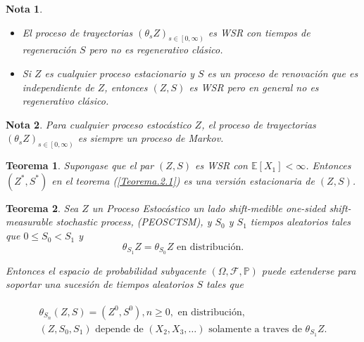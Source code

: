 \documentclass{article}
\newtheorem{Teo}{Teorema}%
\newtheorem{Note}{Nota}%
\newcommand{\esp}{\mathbb{E}}
\newcommand{\prob}{\mathbb{P}}
\numberwithin{equation}{section}
\begin{document}
\begin{Note}
\begin{itemize}
\item El proceso de trayectorias $\left(\theta_{s}Z\right)_{s\in\left[0,\infty\right)}$ es WSR con tiempos de regeneraci\'on $S$ pero no es regenerativo cl\'asico.

\item Si $Z$ es cualquier proceso estacionario y $S$ es un proceso de renovaci\'on que es independiente de $Z$, entonces $\left(Z,S\right)$ es WSR pero en general no es regenerativo cl\'asico.
\end{itemize}
\end{Note}

\begin{Note}
Para cualquier proceso estoc\'astico $Z$, el proceso de trayectorias $\left(\theta_{s}Z\right)_{s\in\left[0,\infty\right)}$ es siempre un proceso de Markov.
\end{Note}


\begin{Teo}\label{Teo.4.1}
Supongase que el par $\left(Z,S\right)$ es WSR con $\esp\left[X_{1}\right]<\infty$. Entonces $\left(Z^{*},S^{*}\right)$ en el teorema (\ref{Teorema.2.1}) es una versi\'on estacionaria de $\left(Z,S\right)$.
\end{Teo}

\begin{Teo}\label{Tma.Existencia.Tiempos.Regeneracion}
Sea $Z$ un Proceso Estoc\'astico un lado shift-medible \textit{one-sided shift-measurable stochastic process}, (PEOSCTSM), y $S_{0}$ y $S_{1}$ tiempos aleatorios tales que $0\leq S_{0}<S_{1}$ y
\begin{equation}
\theta_{S_{1}}Z=\theta_{S_{0}}Z\textrm{ en distribuci\'on}.
\end{equation}

Entonces el espacio de probabilidad subyacente $\left(\Omega,\mathcal{F},\prob\right)$ puede extenderse para soportar una sucesi\'on de tiempos aleatorios $S$ tales que

\begin{eqnarray}
\begin{array}{l}
\theta_{S_{n}}\left(Z,S\right)=\left(Z^{0},S^{0}\right),n\geq0,\textrm{ en distribuci\'on},\\
\left(Z,S_{0},S_{1}\right)\textrm{ depende de }\left(X_{2},X_{3},\ldots\right)\textrm{ solamente a traves de }\theta_{S_{1}}Z.
\end{array}
\end{eqnarray}
\end{Teo}
\end{document}
